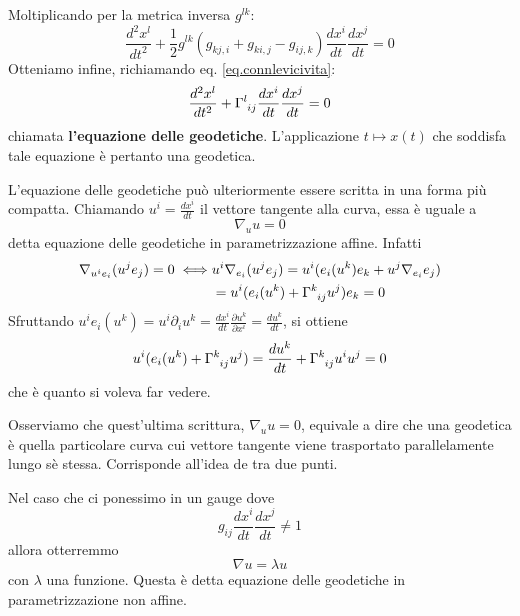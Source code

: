 Moltiplicando per la metrica inversa $g^{lk}$:
\begin{equation*}
    \frac{d^2 x^l}{dt^2} + \frac{1}{2}g^{lk}( g_{kj,i} + g_{ki,j} - g_{ij,k} ) \frac{dx^i}{dt}\frac{dx^j}{dt} = 0
\end{equation*}
Otteniamo infine, richiamando eq. \ref{eq.connlevicivita}:
\begin{equation}
    \frac{d^2 x^l}{dt^2} + \tensor{\Gamma}{^l_{ij}}\frac{dx^i}{dt}\frac{dx^j}{dt} = 0
    \label{eq.geodetiche}
\end{equation}
chiamata \textbf{l'equazione delle geodetiche}. L'applicazione $t \mapsto x(t)$ che soddisfa tale equazione è pertanto una geodetica.

L'equazione delle geodetiche può ulteriormente essere scritta in una forma più compatta. Chiamando $u^i=\frac{dx^i}{dt}$ il vettore tangente alla curva, essa è uguale a
\begin{equation}
    \nabla_u u = 0
\end{equation}
detta equazione delle geodetiche in parametrizzazione affine. Infatti
\begin{align*}
    \nabla_{u^ie_i}(u^je_j) = 0 \iff & u^i \nabla_{e_i}(u^je_j) =u^i( e_i(u^k)e_k + u^j\nabla_{e_i}e_j) \\
    &=u^i( e_i(u^k) + \tensor{\Gamma}{^k_{ij}}u^j)e_k = 0
\end{align*}
Sfruttando $u^ie_i(u^k) = u^i\partial_iu^k = \frac{dx^i}{dt}\frac{\partial u^k}{\partial x^i} = \frac{du^k}{dt}$, si ottiene
\begin{equation*}
    u^i( e_i(u^k) + \tensor{\Gamma}{^k_{ij}}u^j) =     \frac{d u^k}{dt} + \tensor{\Gamma}{^k_{ij}}u^iu^j = 0
\end{equation*}
che è quanto si voleva far vedere.

Osserviamo che quest'ultima scrittura, $\nabla_u u = 0$, equivale a dire che una geodetica è quella particolare curva cui vettore tangente viene trasportato parallelamente lungo sè stessa. Corrisponde all'idea de  tra due punti.

Nel caso che ci ponessimo in un gauge dove
\begin{equation*}
    g_{ij}\frac{dx^i}{dt}\frac{dx^j}{dt} \neq 1
\end{equation*}
allora otterremmo
\begin{equation*}
    \nabla u = \lambda u
\end{equation*}
con $\lambda$ una funzione. Questa è detta equazione delle geodetiche in parametrizzazione non affine.